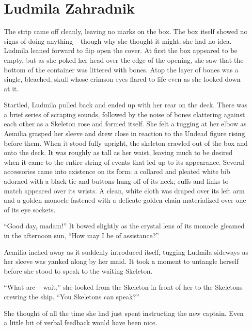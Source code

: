 \chapter{Ludmila Zahradnik}

The strip came off cleanly, leaving no marks on the box. The box itself showed no signs of doing anything – though why she thought it might, she had no idea. Ludmila leaned forward to flip open the cover. At first the box appeared to be empty, but as she poked her head over the edge of the opening, she saw that the bottom of the container was littered with bones. Atop the layer of bones was a single, bleached, skull whose crimson eyes flared to life even as she looked down at it.

 

Startled, Ludmila pulled back and ended up with her rear on the deck. There was a brief series of scraping sounds, followed by the noise of bones clattering against each other as a Skeleton rose and formed itself. She felt a tugging at her elbow as Aemilia grasped her sleeve and drew close in reaction to the Undead figure rising before them. When it stood fully upright, the skeleton crawled out of the box and onto the deck. It was roughly as tall as her waist, leaving much to be desired when it came to the entire string of events that led up to its appearance. Several accessories came into existence on its form: a collared and pleated white bib adorned with a black tie and buttons hung off of its neck; cuffs and links to match appeared over its wrists. A clean, white cloth was draped over its left arm and a golden monocle fastened with a delicate golden chain materialized over one of its eye sockets.

 

“Good day, madam!” It bowed slightly as the crystal lens of its monocle gleamed in the afternoon sun, “How may I be of assistance?”

 

Aemilia inched away as it suddenly introduced itself, tugging Ludmila sideways as her sleeve was yanked along by her maid. It took a moment to untangle herself before she stood to speak to the waiting Skeleton.

 

“What are – wait,” she looked from the Skeleton in front of her to the Skeletons crewing the ship. “You Skeletons can speak?”

 

She thought of all the time she had just spent instructing the new captain. Even a little bit of verbal feedback would have been nice.

